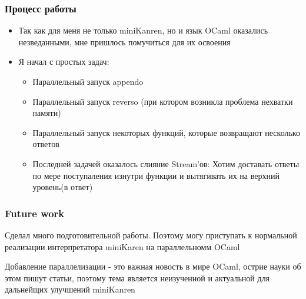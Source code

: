 \documentclass{beamer}
\begin{document}
\begin{frame}
  \frametitle{Процесс работы}
  \begin{itemize}
  \item Так как для меня не только miniKanren, но и язык OCaml оказались незведанными, мне пришлось помучиться для их освоения
  \item Я начал с простых задач:
  \begin{itemize}
  \item Параллельный запуск appendo
  \item Параллельный запуск reverso (при котором возникла проблема нехватки памяти)
  \item Параллельный запуск некоторых функций, которые возвращают несколько ответов
  \item Последней задачей оказалось слияние Stream'ов: Хотим доставать ответы по мере поступаления изнутри функции и вытягивать их на верхний уровень(в ответ)
  \end{itemize}
  \end{itemize}
  \end{frame}


\begin{frame}[t]
  \frametitle{Future work}
  \begin{center}
  \item Сделал много подготовительной работы. Поэтому могу приступать к нормальной реализации интерпретатора miniKaren на параллельномм OCaml
  \item Добавление параллелизации - это важная новость в мире OCaml, острие науки об этом пишут статьи, поэтому тема является неизученной и актуальной для дальнейщих улучшений miniKanren
  \end{center}
  
  \end{frame}
\end{document}
